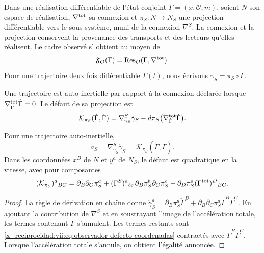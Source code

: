Dans une réalisation différentiable de l'état conjoint
\(\Gamma=(x,\mathcal O,m)\), soient \(N\) son espace de réalisation,
\(\nabla^{\rm tot}\) sa connexion et \(\pi_S:N\to N_S\) une
projection différentiable vers le sous-système, muni de la connexion
\(\nabla^S\). La connexion et la projection conservent la provenance
des transports et des lecteurs qu'elles réalisent. Le cadre observé s'
obtient au moyen de
\[
 \mathfrak F_{\mathcal O}(\Gamma)
 =\operatorname{Res}_{\mathcal O}(\Gamma,\nabla^{\rm tot}).
\]
Pour une trajectoire deux fois différentiable \(\Gamma(t)\),
nous écrivons \(\gamma_S=\pi_S\circ\Gamma\).

\begin{definition}
\label{x_reciprocidad:vii:def:observador-autoinercia}
Une trajectoire est auto-inertielle par rapport à la connexion déclarée
lorsque \(\nabla^{\rm tot}_{\dot\Gamma}\dot\Gamma=0\).
Le défaut de sa projection est
\begin{equation}
 \mathcal K_{\pi_S}(\dot\Gamma,\dot\Gamma)
 =\nabla^S_{\dot\gamma_S}\dot\gamma_S
  -d\pi_S\bigl(\nabla^{\rm tot}_{\dot\Gamma}\dot\Gamma\bigr).
 \label{x_reciprocidad:vii:eq:observador-defecto-proyeccion}
\end{equation}
\end{definition}

\begin{proposition}
\label{x_reciprocidad:vii:prop:observador-aceleracion}
Pour une trajectoire auto-inertielle,
\[
 a_S=\nabla^S_{\dot\gamma_S}\dot\gamma_S
     =\mathcal K_{\pi_S}(\dot\Gamma,\dot\Gamma).
\]
Dans les coordonnées \(x^B\) de \(N\) et \(y^a\) de \(N_S\), le
défaut est quadratique en la vitesse, avec pour composantes
\begin{equation}
 (\mathcal K_{\pi_S})^a{}_{BC}
 =\partial_B\partial_C\pi_S^a
  +(\Gamma^S)^a{}_{bc}\,
        \partial_B\pi_S^b\partial_C\pi_S^c
  -\partial_D\pi_S^a(\Gamma^{\rm tot})^D{}_{BC}.
 \label{x_reciprocidad:vii:eq:observador-defecto-coordenadas}
\end{equation}
\end{proposition}

\begin{proof}
La règle de dérivation en chaîne donne \(\ddot\gamma_S^a=\partial_B\pi_S^a\ddot\Gamma^B
 +\partial_B\partial_C\pi_S^a\dot\Gamma^B\dot\Gamma^C\). En ajoutant la contribution de \(\nabla^S\) et en soustrayant l'image de l'accélération totale, les termes contenant \(\ddot\Gamma\) s'annulent. Les termes restants sont \eqref{x_reciprocidad:vii:eq:observador-defecto-coordenadas} contractés avec \(\dot\Gamma^B\dot\Gamma^C\). Lorsque l'accélération totale s'annule, on obtient l'égalité annoncée.
\end{proof}

